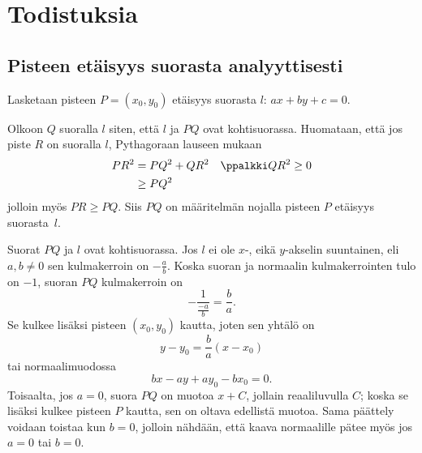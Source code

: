 \section{Todistuksia}

\subsection*{Pisteen etäisyys suorasta analyyttisesti}

Lasketaan pisteen $P = (x_0, y_0)$ etäisyys suorasta $l$: $ax+by+c=0$.

Olkoon $Q$ suoralla $l$ siten, että $l$ ja $PQ$ ovat kohtisuorassa. Huomataan, että jos piste $R$ on suoralla $l$, Pythagoraan lauseen mukaan
\begin{align*}
  PR^2 &= PQ^2+QR^2 && \ppalkki QR^2 \geq 0\\
       &\geq PQ^2
\end{align*}
jolloin myös $PR \geq PQ$. Siis $PQ$ on määritelmän nojalla pisteen $P$ etäisyys suorasta~$l$.

Suorat $PQ$ ja $l$ ovat kohtisuorassa. Jos $l$ ei ole $x$-, eikä $y$-akselin suuntainen, eli $a,b \neq 0$ sen kulmakerroin on $-\frac{a}{b}$. Koska suoran ja normaalin kulmakerrointen tulo on $-1$, suoran $PQ$ kulmakerroin on
\[
-\frac{1}{\frac{-a}{b}} = \frac{b}{a}.
\]
Se kulkee lisäksi pisteen $(x_0,y_0)$ kautta, joten sen yhtälö on
\[
y-y_0 = \frac{b}{a}(x-x_0)
\]
tai normaalimuodossa
\[
bx-ay+ay_0-bx_0 = 0.
\]
Toisaalta, jos $a = 0$, suora $PQ$ on muotoa $x+C$, jollain reaaliluvulla $C$; koska se lisäksi kulkee pisteen $P$ kautta, sen on oltava edellistä muotoa. Sama päättely voidaan toistaa kun $b = 0$, jolloin nähdään, että kaava normaalille pätee myös jos $a = 0$ tai $b = 0$.

